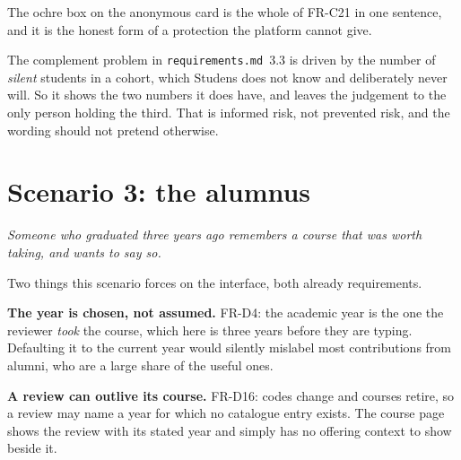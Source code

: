 \documentclass[11pt,a4paper]{article}
\begin{document}
\begin{careful}
The ochre box on the anonymous card is the whole of FR-C21 in one sentence, and
it is the honest form of a protection the platform cannot give.

The complement problem in \texttt{requirements.md}~3.3 is driven by the number
of \emph{silent} students in a cohort, which Studens does not know and
deliberately never will. So it shows the two numbers it does have, and leaves
the judgement to the only person holding the third. That is informed risk, not
prevented risk, and the wording should not pretend otherwise.
\end{careful}


\newpage
\section{Scenario 3: the alumnus}

\textit{Someone who graduated three years ago remembers a course that was worth
taking, and wants to say so.}

\begin{center}
\end{center}

Two things this scenario forces on the interface, both already requirements.

\textbf{The year is chosen, not assumed.} FR-D4: the academic year is the one
the reviewer \emph{took} the course, which here is three years before they are
typing. Defaulting it to the current year would silently mislabel most
contributions from alumni, who are a large share of the useful ones.

\textbf{A review can outlive its course.} FR-D16: codes change and courses
retire, so a review may name a year for which no catalogue entry exists. The
course page shows the review with its stated year and simply has no offering
context to show beside it.
\end{document}
